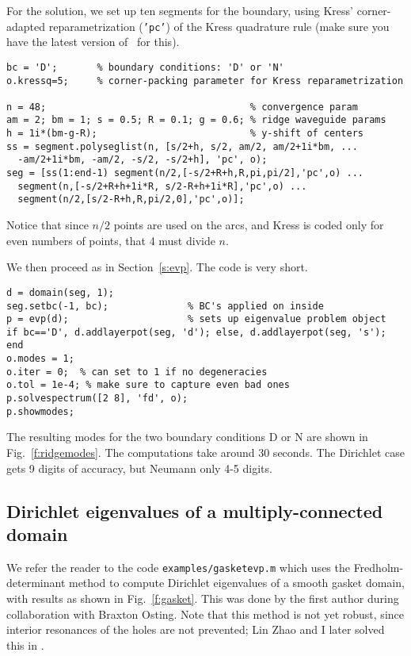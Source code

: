 For the solution, we set up ten segments for the boundary,
using Kress' corner-adapted reparametrization ({\tt 'pc'}) of the Kress
quadrature rule (make sure you have the latest version of \mpspack\
for this).
\begin{verbatim}
bc = 'D';       % boundary conditions: 'D' or 'N'
o.kressq=5;     % corner-packing parameter for Kress reparametrization

n = 48;                                    % convergence param
am = 2; bm = 1; s = 0.5; R = 0.1; g = 0.6; % ridge waveguide params
h = 1i*(bm-g-R);                           % y-shift of centers
ss = segment.polyseglist(n, [s/2+h, s/2, am/2, am/2+1i*bm, ...
  -am/2+1i*bm, -am/2, -s/2, -s/2+h], 'pc', o);
seg = [ss(1:end-1) segment(n/2,[-s/2+R+h,R,pi,pi/2],'pc',o) ...
  segment(n,[-s/2+R+h+1i*R, s/2-R+h+1i*R],'pc',o) ...
  segment(n/2,[s/2-R+h,R,pi/2,0],'pc',o)];
\end{verbatim}
Notice that since $n/2$ points are used on the arcs, and Kress is coded
only for even numbers of points, that 4 must divide $n$.

We then proceed as in Section~\ref{s:evp}. The code is very short.
\begin{verbatim}
d = domain(seg, 1);
seg.setbc(-1, bc);              % BC's applied on inside
p = evp(d);                     % sets up eigenvalue problem object
if bc=='D', d.addlayerpot(seg, 'd'); else, d.addlayerpot(seg, 's'); end
o.modes = 1;
o.iter = 0;  % can set to 1 if no degeneracies
o.tol = 1e-4; % make sure to capture even bad ones
p.solvespectrum([2 8], 'fd', o);
p.showmodes;
\end{verbatim}
The resulting modes for the two boundary conditions D or N are shown
in Fig.~\ref{f:ridgemodes}.
The computations take around 30 seconds.
The Dirichlet case gets 9 digits of accuracy, but Neumann only 4-5 digits.





\bfi %
\ig{width=\textwidth}{figs/gasket.eps}
\efi

\subsection{Dirichlet eigenvalues of a multiply-connected domain}
\label{s:gasket}

We refer the reader to the code {\tt examples/gasketevp.m} which uses
the Fredholm-determinant method to compute Dirichlet eigenvalues
of a smooth gasket domain, with results as shown in Fig.~\ref{f:gasket}.
This was done by the first author during collaboration with Braxton Osting.
Note that this method is not yet robust, since interior resonances
of the holes are not prevented; Lin Zhao and I later solved this
in \cite{zhaodet}.



